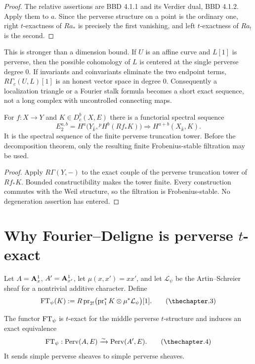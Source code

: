 \begin{proof}
The relative assertions are BBD 4.1.1 and its Verdier dual, BBD 4.1.2.
Apply them to \(a\).  Since the perverse structure on a point is the
ordinary one, right \(t\)-exactness of \(Ra_*\) is precisely the first
vanishing, and left \(t\)-exactness of \(Ra_!\) is the second.
\end{proof}

This is stronger than a dimension bound.  If \(U\) is an affine curve and
\(L[1]\) is perverse, then the possible cohomology of \(L\) is centered at
the single perverse degree \(0\).  If invariants and coinvariants eliminate
the two endpoint terms, \(R\Gamma_c(U,L)[1]\) is an honest vector space in
degree \(0\).  Consequently a localization triangle or a Fourier stalk
formula becomes a short exact sequence, not a long complex with
uncontrolled connecting maps.

\begin{proposition}
\label{prop:perverse-leray-engine}
For \(f:X\to Y\) and \(K\in D^b_c(X,E)\) there is a functorial spectral
sequence
\[
 E_2^{a,b}
   =H^a\bigl(Y_{\bar k},{}^pH^b(Rf_*K)\bigr)
 \Longrightarrow H^{a+b}(X_{\bar k},K).
\tag{\thechapter.2}\label{eq:perverse-leray-engine}
\]
It is the spectral sequence of the finite perverse truncation tower.  Before
the decomposition theorem, only the resulting finite Frobenius-stable
filtration may be used.
\end{proposition}

\begin{proof}
Apply \(R\Gamma(Y,-)\) to the exact couple of the perverse truncation tower
of \(Rf_*K\).  Bounded constructibility makes the tower finite.  Every
construction commutes with the Weil structure, so the filtration is
Frobenius-stable.  No degeneration assertion has entered.
\end{proof}

\section{Why Fourier--Deligne is perverse \texorpdfstring{\(t\)}{t}-exact}

Let \(A=\mathbf A^1_x\), \(A'=\mathbf A^1_{x'}\), let
\(\mu(x,x')=xx'\), and let \(\mathcal L_\psi\) be the Artin--Schreier sheaf
for a nontrivial additive character.  Define
\[
 \FT_\psi(K)
  :=R\pr_{2!}\bigl(\pr_1^*K\otimes\mu^*\mathcal L_\psi\bigr)[1].
\tag{\thechapter.3}\label{eq:fourier-engine-definition}
\]

\begin{theorem}
\label{thm:fourier-perverse-equivalence-engine}
The functor \(\operatorname{FT}_\psi\) is \(t\)-exact for the middle perverse
\(t\)-structure and induces an exact equivalence
\[
  \FT_\psi:\Perv(A,E)\xrightarrow{\sim}\Perv(A',E).
\tag{\thechapter.4}\label{eq:fourier-heart-equivalence}
\]
It sends simple perverse sheaves to simple perverse sheaves.
\end{theorem}

